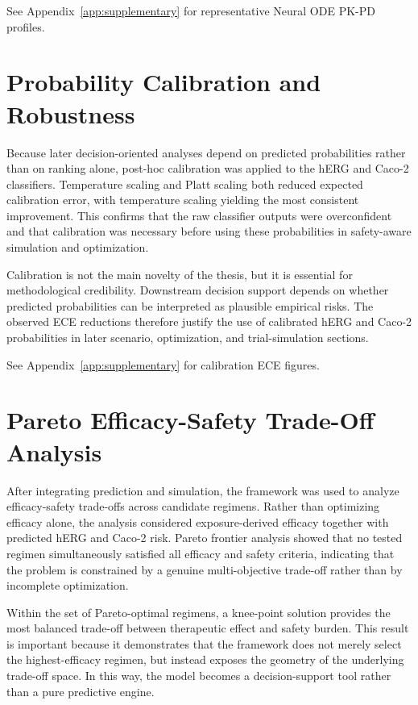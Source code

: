 \documentclass[a4paper,11pt,twoside]{report}
\begin{document}
See Appendix~\ref{app:supplementary} for representative Neural ODE PK-PD profiles.

\section{Probability Calibration and Robustness}

Because later decision-oriented analyses depend on predicted probabilities rather than on ranking alone, post-hoc calibration was applied to the hERG and Caco-2 classifiers. Temperature scaling and Platt scaling both reduced expected calibration error, with temperature scaling yielding the most consistent improvement. This confirms that the raw classifier outputs were overconfident and that calibration was necessary before using these probabilities in safety-aware simulation and optimization.

Calibration is not the main novelty of the thesis, but it is essential for methodological credibility. Downstream decision support depends on whether predicted probabilities can be interpreted as plausible empirical risks. The observed ECE reductions therefore justify the use of calibrated hERG and Caco-2 probabilities in later scenario, optimization, and trial-simulation sections.


See Appendix~\ref{app:supplementary} for calibration ECE figures.

\section{Pareto Efficacy-Safety Trade-Off Analysis}

After integrating prediction and simulation, the framework was used to analyze efficacy-safety trade-offs across candidate regimens. Rather than optimizing efficacy alone, the analysis considered exposure-derived efficacy together with predicted hERG and Caco-2 risk. Pareto frontier analysis showed that no tested regimen simultaneously satisfied all efficacy and safety criteria, indicating that the problem is constrained by a genuine multi-objective trade-off rather than by incomplete optimization.

Within the set of Pareto-optimal regimens, a knee-point solution provides the most balanced trade-off between therapeutic effect and safety burden. This result is important because it demonstrates that the framework does not merely select the highest-efficacy regimen, but instead exposes the geometry of the underlying trade-off space. In this way, the model becomes a decision-support tool rather than a pure predictive engine.
\end{document}
